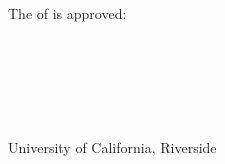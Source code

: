 \null
\vspace{0.1in}

The \DocumentType{} of \Author{} is approved: \\

\begin{center}
\vspace{0.2in}

\hspace{1.5in} \hrulefill \\
\vspace{0.5in}

\hspace{1.5in} \hrulefill \\
\vspace{0.5in}

\hspace{1.5in} \hrulefill \\
\vspace{-12pt}
\end{center}


\vspace{0.4in}
\begin{center}
    University of California, Riverside
\end{center}
